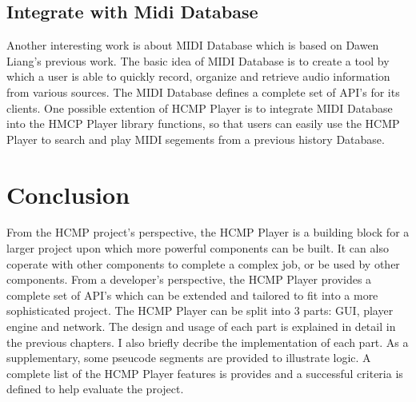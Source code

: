 \subsection{Integrate with Midi Database}
Another interesting work is about MIDI Database\cite{Dawen:ISMIR2011} which 
is based on Dawen Liang's previous work. The basic idea of MIDI Database 
is to create a tool by which a user is able to quickly record, organize
and retrieve audio information from various sources. The MIDI Database 
defines a complete set of API's for its clients. One possible extention of HCMP 
Player is to integrate MIDI Database into the HMCP Player library functions, 
so that users can easily use the HCMP Player to search and play MIDI 
segements from a previous history Database.

\section{Conclusion}
From the HCMP project's perspective, the HCMP Player is a building block for a 
larger project upon which more powerful components can be built. It can also 
coperate with other components to complete a complex job, or be used by other
components. From a developer's 
perspective, the HCMP Player provides a complete set of API's which can be extended 
and tailored to fit into a more sophisticated project.
The HCMP Player can be split into 3 parts:  
GUI, player engine and network. The design and usage of each part 
is explained in detail in the previous chapters. I also briefly decribe 
the implementation of each part. As a supplementary,
some pseucode segments are provided to illustrate logic. A complete list of
the HCMP Player features is provides and a successful criteria is defined to
help evaluate the project.
